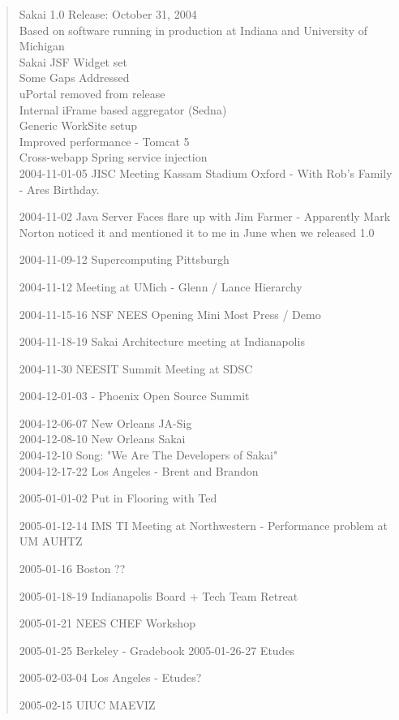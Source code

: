 \begin{quote}
Sakai 1.0 Release: October 31, 2004\\
Based on software running in production at Indiana and University of Michigan\\
Sakai JSF Widget set\\
Some Gaps Addressed\\
uPortal removed from release\\
Internal iFrame based aggregator (Sedna)\\
Generic WorkSite setup\\
Improved performance - Tomcat 5\\
Cross-webapp Spring service injection\\

2004-11-01-05 JISC Meeting Kassam Stadium Oxford - With Rob's Family - Ares Birthday.

2004-11-02 Java Server Faces flare up with Jim Farmer - Apparently Mark Norton noticed it and mentioned it to me in June when we released 1.0

2004-11-09-12 Supercomputing Pittsburgh

2004-11-12 Meeting at UMich - Glenn / Lance Hierarchy

2004-11-15-16 NSF NEES Opening Mini Most Press / Demo

2004-11-18-19 Sakai Architecture meeting at Indianapolis

2004-11-30 NEESIT Summit Meeting at SDSC

2004-12-01-03 - Phoenix Open Source Summit

2004-12-06-07 New Orleans JA-Sig\\
2004-12-08-10 New Orleans Sakai\\
2004-12-10 Song: "We Are The Developers of Sakai"\\

2004-12-17-22 Los Angeles - Brent and Brandon

2005-01-01-02 Put in Flooring with Ted

2005-01-12-14 IMS TI Meeting at Northwestern - Performance problem at UM AUHTZ

2005-01-16 Boston ??

2005-01-18-19 Indianapolis Board + Tech Team Retreat

2005-01-21 NEES CHEF Workshop

2005-01-25 Berkeley - Gradebook
2005-01-26-27 Etudes

2005-02-03-04 Los Angeles - Etudes?

2005-02-15 UIUC MAEVIZ


\end{quote}
